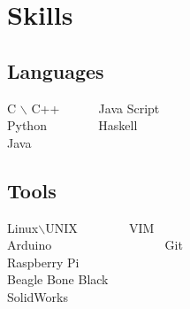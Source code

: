 \documentclass[]{deedy-resume-openfont}
\begin{document}
\begin{minipage}[t]{0.33\textwidth}

%


\section{Skills}
\subsection{Languages}
\textbullet{}  C $\backslash$ C++ \ \ \ \ \ 
\textbullet{} Java Script\\
\textbullet{} Python \ \ \ \ \ \ \ 
\textbullet{} Haskell\\
\textbullet{} Java
\bigbreak
\subsection{Tools}
\textbullet{} Linux$\backslash$UNIX \ \ \ \ \ \ \ 
\textbullet{} VIM \\
\textbullet{} Arduino \ \ \ \ \ \ \ \ \ \ \ \ \ \ \ \ \ 
\textbullet{} Git \\
\textbullet{} Raspberry Pi \\
\textbullet{} Beagle Bone Black \\
\textbullet{} SolidWorks
\bigbreak

\end{minipage}
\end{document}
